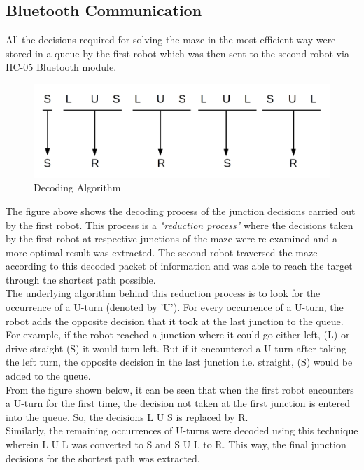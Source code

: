 \subsection{Bluetooth Communication}
All the decisions required for solving the maze in the most efficient way were stored in a queue by the first robot which was then sent to the second robot via HC-05 Bluetooth module.\\
\begin{figure}[h]
\center
\includegraphics[scale=0.2]{decoding.jpg} 
\caption{Decoding Algorithm}
\end{figure}
\justify The figure above shows the decoding process of the junction decisions carried out by the first robot. This process is a \textit{"reduction process"} where the decisions taken by the first robot at respective junctions of the maze were re-examined and a more optimal result was extracted. The second robot traversed the maze according to this decoded packet of information and was able to reach the target through the shortest path possible.\\
The underlying algorithm behind this reduction process is to look for the occurrence of a U-turn (denoted by 'U'). For every occurrence of a U-turn, the robot adds the opposite decision that it took at the last junction  to the queue.\\
For example, if the robot reached a junction where it could go either left, (L) or drive straight (S)  it would turn left. But if it encountered a U-turn after taking the left turn, the opposite decision in the last junction i.e. straight, (S) would be added to the queue. \\
From the figure shown below, it can be seen that when the first robot encounters a U-turn for the first time, the decision not taken at the first junction is entered into the queue. So, the decisions L U S is replaced by R. \\
Similarly, the remaining occurrences of U-turns were decoded using this technique wherein L U L was converted to S and S U L to R. This way, the final junction decisions for the shortest path was extracted.\\
